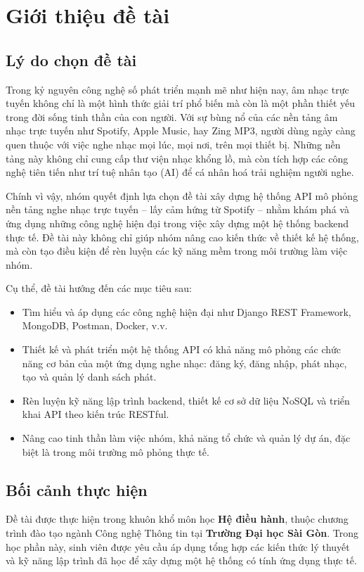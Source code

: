 \chapter{Giới thiệu đề tài}

\section{Lý do chọn đề tài}

Trong kỷ nguyên công nghệ số phát triển mạnh mẽ như hiện nay, âm nhạc trực tuyến không chỉ là một hình thức giải trí phổ biến mà còn là một phần thiết yếu trong đời sống tinh thần của con người. Với sự bùng nổ của các nền tảng âm nhạc trực tuyến như Spotify, Apple Music, hay Zing MP3, người dùng ngày càng quen thuộc với việc nghe nhạc mọi lúc, mọi nơi, trên mọi thiết bị. Những nền tảng này không chỉ cung cấp thư viện nhạc khổng lồ, mà còn tích hợp các công nghệ tiên tiến như trí tuệ nhân tạo (AI) để cá nhân hoá trải nghiệm người nghe.

Chính vì vậy, nhóm quyết định lựa chọn đề tài xây dựng hệ thống API mô phỏng nền tảng nghe nhạc trực tuyến – lấy cảm hứng từ Spotify – nhằm khám phá và ứng dụng những công nghệ hiện đại trong việc xây dựng một hệ thống backend thực tế. Đề tài này không chỉ giúp nhóm nâng cao kiến thức về thiết kế hệ thống, mà còn tạo điều kiện để rèn luyện các kỹ năng mềm trong môi trường làm việc nhóm.

Cụ thể, đề tài hướng đến các mục tiêu sau:
\begin{itemize}
    \item Tìm hiểu và áp dụng các công nghệ hiện đại như Django REST Framework, MongoDB, Postman, Docker, v.v.
    \item Thiết kế và phát triển một hệ thống API có khả năng mô phỏng các chức năng cơ bản của một ứng dụng nghe nhạc: đăng ký, đăng nhập, phát nhạc, tạo và quản lý danh sách phát.
    \item Rèn luyện kỹ năng lập trình backend, thiết kế cơ sở dữ liệu NoSQL và triển khai API theo kiến trúc RESTful.
    \item Nâng cao tinh thần làm việc nhóm, khả năng tổ chức và quản lý dự án, đặc biệt là trong môi trường mô phỏng thực tế.
\end{itemize}

\section{Bối cảnh thực hiện}

Đề tài được thực hiện trong khuôn khổ môn học \textbf{Hệ điều hành}, thuộc chương trình đào tạo ngành Công nghệ Thông tin tại \textbf{Trường Đại học Sài Gòn}. Trong học phần này, sinh viên được yêu cầu áp dụng tổng hợp các kiến thức lý thuyết và kỹ năng lập trình đã học để xây dựng một hệ thống có tính ứng dụng thực tế.

